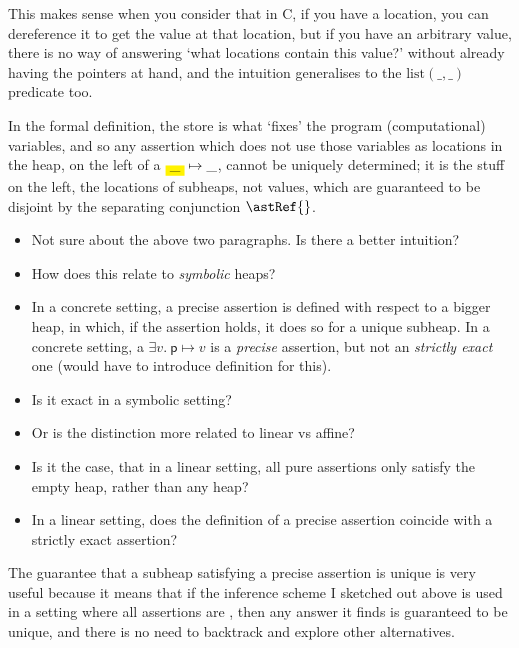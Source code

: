 This makes sense when you consider that in C, if you have a location, you can
dereference it to get the value at that location, but if you have an arbitrary
value, there is no way of answering `what locations contain this
value?'
without already having the pointers at hand, and the intuition generalises to
the $\mathrm{list}(\_, \_)$ predicate too.

In the formal definition, the store is what `fixes' the program (computational)
variables, and so any assertion which does not use those variables as locations
in the heap, on the left of a $\colorbox{yellow}{\_} \mapsto{} \_$, cannot be
uniquely determined; it is the stuff on the left, the locations of subheaps,
not values, which are guaranteed to be disjoint by the separating conjunction
$\astRef{}$.

\begin{itemize}
    \item Not sure about the above two paragraphs. Is there a better intuition?
    \item How does this relate to \emph{symbolic} heaps?
    \item In a concrete setting, a precise assertion is defined with respect to
        a bigger heap, in which, if the assertion holds, it does so for a
        unique subheap. In a concrete setting, a $\exists v.\ \mathsf{p}
        \mapsto{} v$ is a \emph{precise} assertion, but not an \emph{strictly
        exact} one (would have to introduce definition for this).
    \item Is it exact in a symbolic setting?
    \item Or is the distinction more related to linear vs affine?
    \item Is it the case, that in a linear setting, all pure assertions only
        satisfy the empty heap, rather than any heap?
    \item In a linear setting, does the definition of a precise assertion
        coincide with a strictly exact assertion?
\end{itemize}

The guarantee that a subheap satisfying a precise assertion is unique is very
useful because it means that if the inference scheme I sketched out above is
used in a setting where all assertions are , then any answer it
finds is guaranteed to be unique, and there is no need to backtrack and explore
other alternatives.

